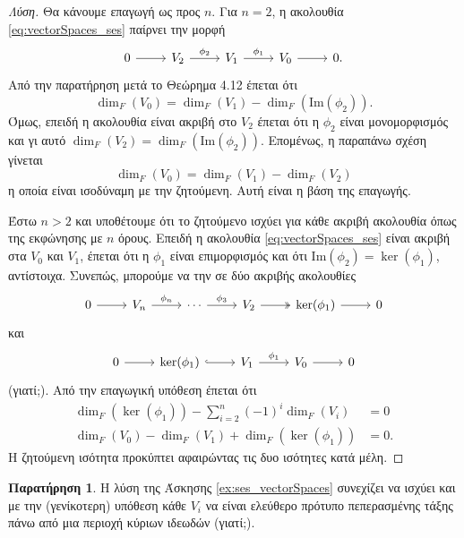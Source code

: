 \documentclass[12pt,a4paper,reqno]{amsart}
\theoremstyle{definition}
\newtheorem*{remark}{Παρατήρηση}
\newcommand{\rmIm}{\mathrm{Im}}
\begin{document}
\begin{proof}[Λύση]
  Θα κάνουμε επαγωγή ως προς $n$. Για $n=2$, η ακολουθία \eqref{eq:vectorSpaces_ses} παίρνει την μορφή 
  \[
  \begin{tikzcd}
      0 \arrow[r] & V_2 \arrow[r, "\phi_2"] & V_1 \arrow[r, "\phi_1
    "] & V_0 \arrow[r] & 0.
  \end{tikzcd}
  \]
  Από την παρατήρηση μετά το Θεώρημα 4.12 έπεται ότι 
  \[
  \dim_F\left(
    V_0
  \right) = \dim_F\left(
    V_1
  \right) - \dim_F\left(
    \rmIm(\phi_2)
  \right).
  \]
  Όμως, επειδή η ακολουθία είναι ακριβή στο $V_2$ έπεται ότι η $\phi_2$ είναι μονομορφισμός και γι αυτό $\dim_F(V_2) = \dim_F\left(
    \rmIm(\phi_2)
  \right)$. Επομένως, η παραπάνω σχέση γίνεται 
  \[
  \dim_F\left(
    V_0
  \right) = \dim_F\left(
    V_1
  \right) - \dim_F\left(
    V_2
  \right)
  \] 
  η οποία είναι ισοδύναμη με την ζητούμενη. Αυτή είναι η βάση της επαγωγής.

  Έστω $n > 2$ και υποθέτουμε ότι το ζητούμενο ισχύει για κάθε ακριβή ακολουθία όπως της εκφώνησης με $n$ όρους. Επειδή η ακολουθία \eqref{eq:vectorSpaces_ses} είναι ακριβή στα $V_0$ και $V_1$, έπεται ότι η $\phi_1$ είναι επιμορφισμός και ότι $\rmIm(\phi_2) = \ker(\phi_1)$, αντίστοιχα. Συνεπώς, μπορούμε να την  σε δύο ακριβής ακολουθίες 
  \[
  \begin{tikzcd}
      0 \arrow[r] & V_n \arrow[r, "\phi_n"] & \cdots \arrow[r, "\phi_3"] & V_2 \arrow[r, two heads] & \ker(\phi_1) \arrow[r] & 0
    \end{tikzcd}
  \]
  και 
  \[
  \begin{tikzcd}
      0 \arrow[r] & \ker(\phi_1) \arrow[r, hook] & V_1 \arrow[r, "\phi_1
    "] & V_0 \arrow[r] & 0
  \end{tikzcd}
  \]
  (γιατί;). Από την επαγωγική υπόθεση έπεται ότι 
  \begin{align*}
    \dim_F\left(
      \ker(\phi_1)
    \right) - \sum_{i=2}^n (-1)^i \dim_F\left(
      V_i
    \right) &= 0 \\ 
    \dim_F\left(
      V_0
    \right) - \dim_F\left(
      V_1
    \right) + \dim_F\left(
      \ker(\phi_1)
    \right) &= 0.
  \end{align*}
  Η ζητούμενη ισότητα προκύπτει αφαιρώντας τις δυο ισότητες κατά μέλη.
\end{proof}

\begin{remark}
  Η λύση της Άσκησης \ref{ex:ses_vectorSpaces} συνεχίζει να ισχύει και με την (γενίκοτερη) υπόθεση κάθε $V_i$ να είναι ελεύθερο πρότυπο πεπερασμένης τάξης πάνω από μια περιοχή κύριων ιδεωδών (γιατί;).
\end{remark}
\end{document}
